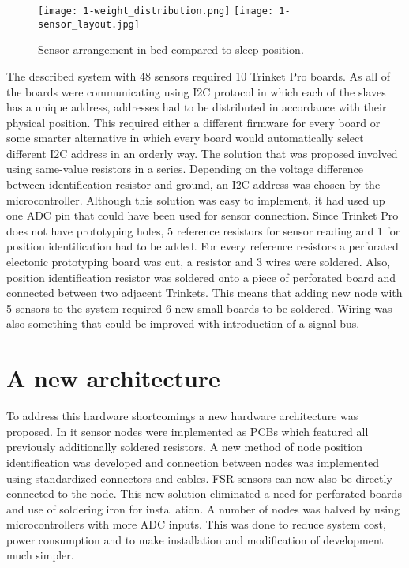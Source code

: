 \begin{figure}[h]
  \begin{center}
    \texttt{[image: 1-weight\_distribution.png]}
    \texttt{[image: 1-sensor\_layout.jpg]}
  \end{center}
  \caption{Sensor arrangement in bed compared to sleep position.}
  \label{fig:sensor-layout}
\end{figure}

The described system with 48 sensors required 10 Trinket Pro boards. As all of the boards were communicating using \ac{I2C} protocol in which each of the slaves has a unique address, addresses had to be distributed in accordance with their physical position. This required either a different firmware for every board or some smarter alternative in which every board would automatically select different I2C address in an orderly way. The solution that was proposed involved using same-value resistors in a series. Depending on the voltage difference between identification resistor and ground, an \ac{I2C} address was chosen by the microcontroller. Although this solution was easy to implement, it had used up one ADC pin that could have been used for sensor connection. Since Trinket Pro does not have prototyping holes, 5 reference resistors for sensor reading and 1 for position identification had to be added. For every reference resistors a perforated electonic prototyping board was cut, a resistor and 3 wires were soldered. Also, position identification resistor was soldered onto a piece of perforated board and connected between two adjacent Trinkets. This means that adding new node with 5 sensors to the system required 6 new small boards to be soldered. Wiring was also something that could be improved with introduction of a signal bus.


\section{A new architecture}

To address this hardware shortcomings a new hardware architecture was proposed. In it sensor nodes were implemented as \ac{PCB}s which featured all previously additionally soldered resistors. A new method of node position identification was developed and connection between nodes was implemented using standardized connectors and cables. \ac{FSR} sensors can now also be directly connected to the node. This new solution eliminated a need for perforated boards and use of soldering iron for installation. A number of nodes was halved by using microcontrollers with more \ac{ADC} inputs. This was done to reduce system cost, power consumption and to make installation and modification of development much simpler. 

